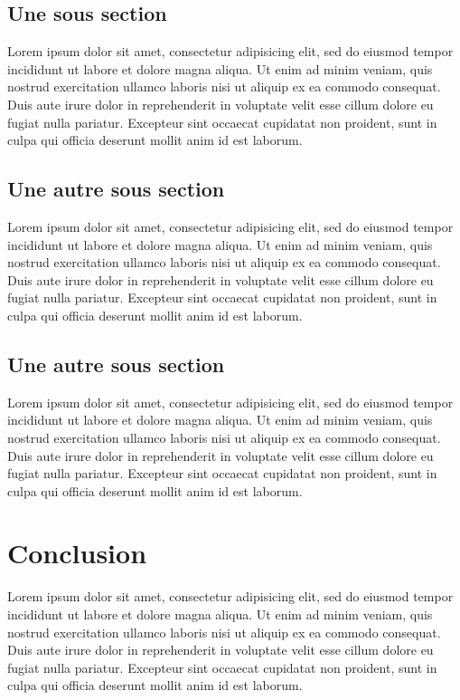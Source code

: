 \subsection{Une sous section}
Lorem ipsum dolor sit amet, consectetur adipisicing elit, sed do eiusmod
tempor incididunt ut labore et dolore magna aliqua. Ut enim ad minim veniam,
quis nostrud exercitation ullamco laboris nisi ut aliquip ex ea commodo
consequat. Duis aute irure dolor in reprehenderit in voluptate velit esse
cillum dolore eu fugiat nulla pariatur. Excepteur sint occaecat cupidatat non
proident, sunt in culpa qui officia deserunt mollit anim id est laborum.

\subsection{Une autre sous section}
Lorem ipsum dolor sit amet, consectetur adipisicing elit, sed do eiusmod
tempor incididunt ut labore et dolore magna aliqua. Ut enim ad minim veniam,
quis nostrud exercitation ullamco laboris nisi ut aliquip ex ea commodo
consequat. Duis aute irure dolor in reprehenderit in voluptate velit esse
cillum dolore eu fugiat nulla pariatur. Excepteur sint occaecat cupidatat non
proident, sunt in culpa qui officia deserunt mollit anim id est laborum.

\subsection{Une autre sous section}
Lorem ipsum dolor sit amet, consectetur adipisicing elit, sed do eiusmod
tempor incididunt ut labore et dolore magna aliqua. Ut enim ad minim veniam,
quis nostrud exercitation ullamco laboris nisi ut aliquip ex ea commodo
consequat. Duis aute irure dolor in reprehenderit in voluptate velit esse
cillum dolore eu fugiat nulla pariatur. Excepteur sint occaecat cupidatat non
proident, sunt in culpa qui officia deserunt mollit anim id est laborum.

\section{Conclusion}
Lorem ipsum dolor sit amet, consectetur adipisicing elit, sed do eiusmod
tempor incididunt ut labore et dolore magna aliqua. Ut enim ad minim veniam,
quis nostrud exercitation ullamco laboris nisi ut aliquip ex ea commodo
consequat. Duis aute irure dolor in reprehenderit in voluptate velit esse
cillum dolore eu fugiat nulla pariatur. Excepteur sint occaecat cupidatat non
proident, sunt in culpa qui officia deserunt mollit anim id est laborum.